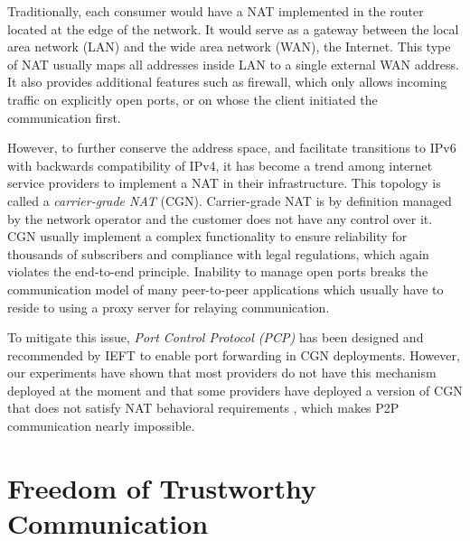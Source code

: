 Traditionally, each consumer would have a NAT implemented in the router located at the edge of the network. It would serve as a gateway between the local area network (LAN) and the wide area network (WAN), the Internet. This type of NAT usually maps all addresses inside LAN to a single external WAN address. It also provides additional features such as firewall, which only allows incoming traffic on explicitly open ports, or on whose the client initiated the communication first.


However, to further conserve the address space, and facilitate transitions to IPv6 with backwards compatibility of IPv4, it has become a trend among internet service providers to implement a NAT in their infrastructure. This topology is called a \textit{carrier-grade NAT} (CGN). Carrier-grade NAT is by definition managed by the network operator and the customer does not have any control over it. CGN usually implement a complex functionality to ensure reliability for thousands of subscribers and compliance with legal regulations, which again violates the end-to-end principle. Inability to manage open ports breaks the communication model of many peer-to-peer applications which usually have to reside to using a proxy server for relaying communication.

To mitigate this issue, \textit{Port Control Protocol (PCP)} \cite{pcp} has been designed and recommended by IEFT to enable port forwarding in CGN deployments. However, our experiments have shown that most providers do not have this mechanism deployed at the moment and that some providers have deployed a version of CGN that does not satisfy NAT behavioral requirements \cite{behave}, which makes P2P communication nearly impossible.



\section{Freedom of Trustworthy Communication}

